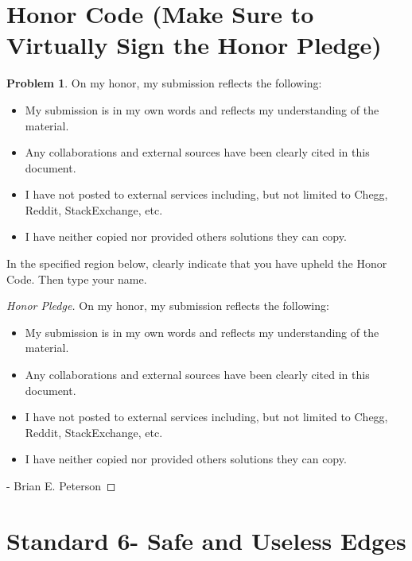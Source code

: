 \documentclass[11pt]{article}
\theoremstyle{definition}
\theoremstyle{definition}
\newtheorem{required}{Problem}
\theoremstyle{definition}
\begin{document}
\section{Honor Code (Make Sure to Virtually Sign the Honor Pledge)} \label{HonorCode}

\begin{required}
On my honor, my submission reflects the following:
\begin{itemize}
\item My submission is in my own words and reflects my understanding of the material.
\item Any collaborations and external sources have been clearly cited in this document.
\item I have not posted to external services including, but not limited to Chegg, Reddit, StackExchange, etc.
\item I have neither copied nor provided others solutions they can copy.
\end{itemize}

\noindent In the specified region below, clearly indicate that you have upheld the Honor Code. Then type your name. 
\end{required}

\begin{proof}[Honor Pledge]
On my honor, my submission reflects the following:
\begin{itemize}
\item My submission is in my own words and reflects my understanding of the material.
\item Any collaborations and external sources have been clearly cited in this document.
\item I have not posted to external services including, but not limited to Chegg, Reddit, StackExchange, etc.
\item I have neither copied nor provided others solutions they can copy.
\end{itemize}
- Brian E. Peterson
\end{proof}


\newpage
\section{Standard 6- Safe and Useless Edges}
\end{document}
